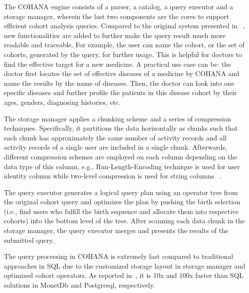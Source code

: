 The COHANA engine consists of a parser, a catalog, a query executor and a storage manager, wherein the last two components are the cores to support efficient cohort analysis queries. 
Compared to the original system presented in ~\cite{jiang2016cohort}, new functionalities are added to further make the query result much more readable and traceable.
For example, the user can name the cohort, or the set of cohorts, generated by the query, for further usage.
This is helpful for doctors to find the effective target for a new medicine. 
A practical use case can be: the doctor first locates the set of effective diseases of a medicine by COHANA and name the results by the name of diseases. Then, the doctor can look into one specific diseases and further profile the patients in this disease cohort by their ages, genders, diagnosing histories, etc.

The storage manager applies a chunking scheme and a series of compression techniques. Specifically, it partitions the data horizontally as chunks such that each chunk has approximately the same number of activity records and all activity records of a single user are included in a single chunk. Afterwards, different compression schemes are employed on each column depending on the data type of this column, e.g., Run-Length-Encoding technique is used for user identity column while two-level compression is used for string columns ~\cite{jiang2016cohort}. %

The query executor generates a logical query plan using an operator tree from the original cohort query and optimizes the plan by pushing the birth selection (i.e., find users who fulfill the birth sequence and allocate them into respective cohorts) into the bottom level of the tree. After scanning each data chunk in the storage manager, the query executor merges and presents the results of the submitted query.

The query processing in COHANA is extremely fast compared to traditional approaches in SQL due to the customized storage layout in storage manager and optimized cohort operators. As reported in~\cite{jiang2016cohort}, it is 10x and 100x faster than SQL solutions in MonetDb\cite{boncz2005monetdb} and Postgresql\cite{momjian2001postgresql}, respectively.

